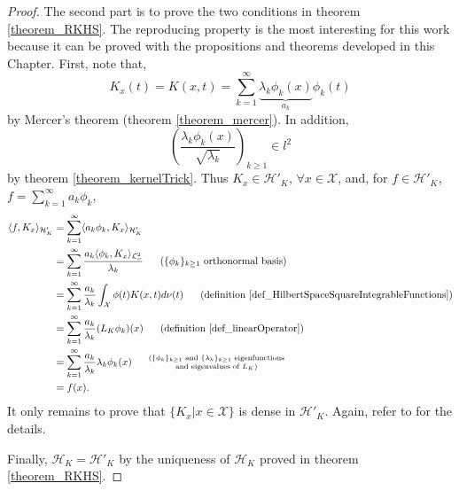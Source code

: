 \begin{theorem}
\begin{proof}
The second part is to prove the two conditions in theorem \ref{theorem_RKHS}. The reproducing property is the most interesting for this work because it can be proved with the propositions and theorems developed in this Chapter. First, note that,
    \begin{equation*} 
      K_x(t) =  K(x,t) = \sum_{k=1}^{\infty} 
           \underbrace{\lambda_k \phi_k(x)}_{a_k} \phi_k(t)
    \end{equation*}
    by Mercer's theorem (theorem \ref{theorem_mercer}). In addition, 
    \begin{equation*}
      \left( \frac{\lambda_k \phi_k(x)}{\sqrt{\lambda_k}} \right)_{k \geq 1} \in l^2
    \end{equation*} 
    by theorem \ref{theorem_kernelTrick}. Thus $K_x \in \mathcal{H}'_K$, $\forall x \in \mathcal{X}$, and, for $f \in \mathcal{H}'_K$, $f = \sum_{k=1}^{\infty} a_k \phi_k$,
    \begin{equation*}
      \begin{aligned}
        \langle f , K_x \rangle_{\mathcal{H}'_K} &= \sum_{k=1}^{\infty} 
                              \langle a_k \phi_k, K_x \rangle_{\mathcal{H}'_K} \\
             &= \sum_{k=1}^{\infty} 
                 \frac{a_k \langle \phi_k, K_x \rangle_{\mathcal{L}_{\nu}^2}}{\lambda_k}
                 \ \ \ \ \
                 \text{($\{\phi_k\}_{k \geq 1}$ orthonormal basis)} \\ 
             &= \sum_{k=1}^{\infty} \frac{a_k}{\lambda_k} \int_{\mathcal{X}} \phi(t)K(x,t)d\nu(t)
                 \ \ \ \ \
                 \text{(definition \ref{def_HilbertSpaceSquareIntegrableFunctions})} \\ 
             &= \sum_{k=1}^{\infty} \frac{a_k}{\lambda_k} (L_K \phi_k)(x)      
                 \ \ \ \ \
                 \text{(definition \ref{def_linearOperator})} \\ 
             &= \sum_{k=1}^{\infty} \frac{a_k}{\lambda_k} \lambda_k \phi_k(x)
                 \ \ \ \ \ 
                 \substack{\text{($\{\phi_k\}_{k \geq 1}$ and $\{\lambda_k\}_{k \geq 1}$ eigenfunctions} \\ \text{and eigenvalues of $L_K$)}} \\
             &= f(x). 
      \end{aligned}
    \end{equation*}
    It only remains to prove that $\{K_x | x \in \mathcal{X}\}$ is dense in $\mathcal{H}'_K$. Again, refer to \textcite{cucker2001} for the details. 
    
    Finally, $\mathcal{H}_K = \mathcal{H}'_K$ by the uniqueness of $\mathcal{H}_K$ proved in theorem \ref{theorem_RKHS}.
  \end{proof}
\end{theorem}

